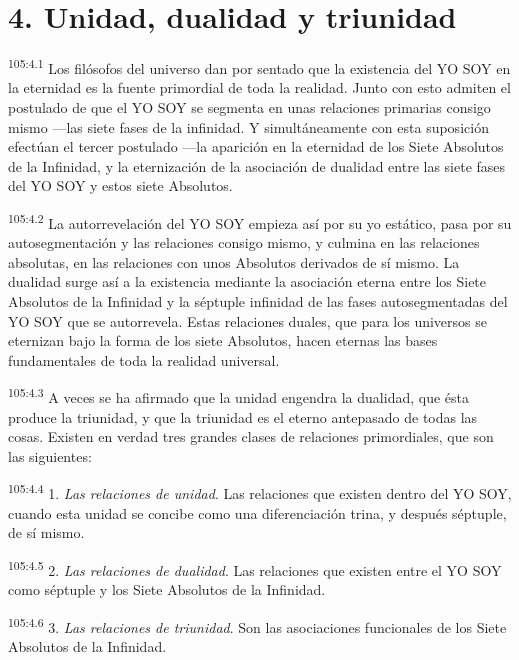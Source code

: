 \documentclass[twoside, 11pt]{book}
\begin{document}
\section*{4. Unidad, dualidad y triunidad}
\par
\textsuperscript{105:4.1} Los filósofos del universo dan por sentado que la existencia del YO SOY en la eternidad es la fuente primordial de toda la realidad. Junto con esto admiten el postulado de que el YO SOY se segmenta en unas relaciones primarias consigo mismo ---las siete fases de la infinidad. Y simultáneamente con esta suposición efectúan el tercer postulado ---la aparición en la eternidad de los Siete Absolutos de la Infinidad, y la eternización de la asociación de dualidad entre las siete fases del YO SOY y estos siete Absolutos.

\par
\textsuperscript{105:4.2} La autorrevelación del YO SOY empieza así por su yo estático, pasa por su autosegmentación y las relaciones consigo mismo, y culmina en las relaciones absolutas, en las relaciones con unos Absolutos derivados de sí mismo. La dualidad surge así a la existencia mediante la asociación eterna entre los Siete Absolutos de la Infinidad y la séptuple infinidad de las fases autosegmentadas del YO SOY que se autorrevela. Estas relaciones duales, que para los universos se eternizan bajo la forma de los siete Absolutos, hacen eternas las bases fundamentales de toda la realidad universal.

\par
\textsuperscript{105:4.3} A veces se ha afirmado que la unidad engendra la dualidad, que ésta produce la triunidad, y que la triunidad es el eterno antepasado de todas las cosas. Existen en verdad tres grandes clases de relaciones primordiales, que son las siguientes:

\par
\textsuperscript{105:4.4} 1. \textit{Las relaciones de unidad}. Las relaciones que existen dentro del YO SOY, cuando esta unidad se concibe como una diferenciación trina, y después séptuple, de sí mismo.

\par
\textsuperscript{105:4.5} 2. \textit{Las relaciones de dualidad}. Las relaciones que existen entre el YO SOY como séptuple y los Siete Absolutos de la Infinidad.

\par
\textsuperscript{105:4.6} 3. \textit{Las relaciones de triunidad}. Son las asociaciones funcionales de los Siete Absolutos de la Infinidad.
\end{document}
